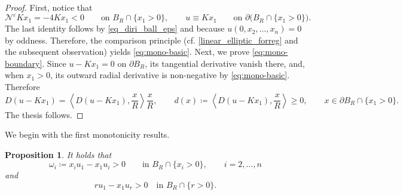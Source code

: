 \documentclass[11pt]{amsart}
\renewcommand{\geq}{\geqslant}
\renewcommand{\le}{<}
\renewcommand{\ge}{>}
\newcommand{\eps}{\varepsilon}
\newcommand{\Ne}{\mathcal N^\eps}
\newtheorem{proposition}[theorem]{Proposition}
\theoremstyle{definition}
\theoremstyle{remark}
\numberwithin{equation}{section}
\begin{document}
\begin{proof}
First, notice that 
\begin{equation*}
    \Ne Kx_1=-4Kx_1\le 0\qquad\text{on }B_R\cap\{x_1\ge 0\},\qquad u\equiv K x_1\qquad\text{on }\partial \big(B_R\cap\{x_1\ge 0\}\big).
\end{equation*}
The last identity follows by \eqref{eq_diri_ball_eps} and because $u(0,x_2,\ldots,x_n)=0$ by oddness. Therefore, the comparison principle \cite[Theorem 3.3]{MR1814364} (cf. \eqref{linear_elliptic_forreg} and the subsequent observation) yields \eqref{eq:mono-basic}. Next, we prove \eqref{eq:mono-boundary}. Since $u-Kx_1=0$ on $\partial B_R$, its tangential derivative vanish there, and, when $x_1\ge 0$, its outward radial derivative is non-negative by \eqref{eq:mono-basic}. Therefore
\begin{equation*}
    D(u-Kx_1)=\left\langle D(u-Kx_1),\frac{x}{R}\right\rangle\frac{x}{R},\qquad d(x)\coloneqq \left\langle D(u-Kx_1),\frac{x}{R}\right\rangle\geq 0,\qquad x\in \partial B_R\cap \{x_1\ge 0\}.
\end{equation*}
The thesis follows.
\end{proof}
We begin with the first monotonicity results.
\begin{proposition}\label{propositionboh39549695}
   It holds that 
   \begin{equation}\label{eq:mono-angular-positive}
 \omega_i\coloneqq x_i u_1-x_1u_i>0\qquad\text{in }B_R\cap\{x_i>0\},\qquad i=2,\ldots,n
\end{equation}
    and
    \begin{equation}\label{tesirotazioneultimapropriowufnj4834}
   r u_1-x_1u_ r\ge 0\quad \text{in }B_R\cap \{r\ge 0\}.
\end{equation}
\end{proposition}
\end{document}

